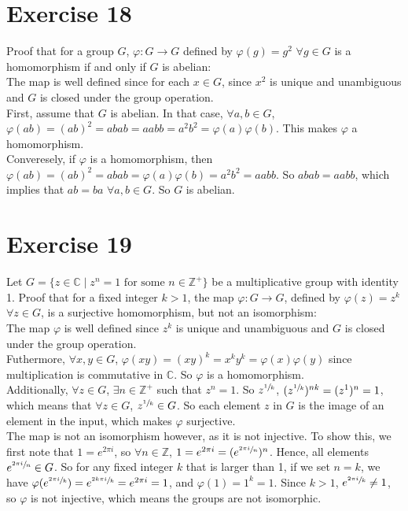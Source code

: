\documentclass[12pt]{article}
\newcommand{\Z}{\mathbb{Z}}
\newcommand{\C}{\mathbb{C}}
\begin{document}
    \section*{Exercise 18}
    Proof that for a group $G$, $\varphi: G \to G$
    defined by $\varphi(g) = g^2$ $\forall g \in G$
    is a homomorphism if and only if $G$ is abelian: \\
    The map is well defined since for each $x \in G$, since $x^2$ is unique
    and unambiguous and $G$ is closed under the group operation. \\
    First, assume that $G$ is abelian.
    In that case, $\forall a, b \in G$,
    $\varphi(ab) = (ab)^2
    = abab
    = aabb
    = a^2b^2
    = \varphi(a)\varphi(b)$.
    This makes $\varphi$ a homomorphism. \\ 
    Converesely, if $\varphi$ is a homomorphism,
    then $\varphi(ab) = (ab)^{2}
    = abab
    = \varphi(a)\varphi(b)
    = a^{2}b^{2} 
    = aabb$.
    So $abab = aabb$,
    which implies that $ab = ba$ $\forall a, b \in G$.
    So $G$ is abelian.
    

    \section*{Exercise 19}
    Let $G = \{z \in \C \mid z^n = 1 \text{ for some } n \in \Z^+ \}$
    be a multiplicative group with identity 1.
    Proof that for a fixed integer $k > 1$,
    the map $\varphi: G \to G$,
    defined by $\varphi(z) = z^k$ $\forall z \in G$,
    is a surjective homomorphism, but not an isomorphism: \\
    The map $\varphi$ is well defined since $z^k$ is unique
    and unambiguous and $G$ is closed under the group operation. \\
    Futhermore, $\forall x, y \in G$,
    $\varphi(xy) = (xy)^k = x^ky^k = \varphi(x)\varphi(y)$
    since multiplication is commutative in $\C$. 
    So $\varphi$ is a homomorphism. \\
    Additionally, $\forall z \in G$, $\exists n \in \Z^+$
    such that $z^n = 1$.
    So $z^{\sfrac{1}{k}}$, $(z^{\sfrac{1}{k}})^{nk} = (z^1)^{n} = 1$,
    which means that $\forall z \in G$, $z^{\sfrac{1}{k}} \in G$.
    So each element $z$ in $G$ is the image of an element in the input,
    which makes $\varphi$ surjective. \\
    The map is not an isomorphism however, as it is not injective.
    To show this, we first note that $1 = e^{2 \pi i}$,
    so $\forall n \in \Z$, $1 = e^{2 \pi i} = (e^{\sfrac{2 \pi i}{n}})^n$.
    Hence, all elements $e^{\sfrac{2 \pi i}{n}} \in G$.
    So for any fixed integer $k$ that is larger than 1,
    if we set $n = k$,
    we have $\varphi(e^{\sfrac{2 \pi i}{k}}) = e^{\sfrac{2k \pi i}{k}}
    = e^{2 \pi i} = 1$,
    and $\varphi(1) = 1^k = 1$.
    Since $k > 1$, $e^{\sfrac{2 \pi i}{k}} \neq 1$,
    so $\varphi$ is not injective,
    which means the groups are not isomorphic.
    
\end{document}
